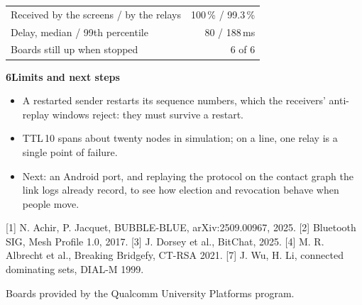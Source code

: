 \documentclass{article}
\renewcommand{\small}{\fontsize{24}{31}\selectfont}
\newcommand{\sect}[1]{\par\vfill\vspace{8mm}%
  {\color{navy}\fontsize{46}{52}\selectfont\bfseries #1\par}%
  \vspace{2mm}{\color{accent}\rule{\linewidth}{1.2mm}}\par\vspace{2mm}}
\begin{document}
\begin{minipage}[t][935mm][t]{245mm}
{\small
\begin{tabularx}{\linewidth}{@{}Xr@{}}
\toprule
Received by the screens / by the relays & 100\,\% / 99.3\,\% \\
Delay, median / 99th percentile & 80 / 188\,ms \\
Boards still up when stopped & 6 of 6 \\
\bottomrule
\end{tabularx}}

\sect{6\enspace Limits and next steps}
\begin{itemize}
  \item A restarted sender restarts its sequence numbers, which the
        receivers' anti-replay windows reject: they must survive a
        restart.
  \item TTL\,10 spans about twenty nodes in simulation; on a line, one
        relay is a single point of failure.
  \item Next: an Android port, and replaying the protocol on the contact
        graph the link logs already record, to see how election and
        revocation behave when people move.
\end{itemize}

\vspace{6mm}
{\fontsize{16}{20}\selectfont\color{muted}
[1] N. Achir, P. Jacquet, BUBBLE-BLUE, arXiv:2509.00967, 2025.
[2] Bluetooth SIG, Mesh Profile 1.0, 2017.
[3] J. Dorsey et al., BitChat, 2025.
[4] M. R. Albrecht et al., Breaking Bridgefy, CT-RSA 2021.
[7] J. Wu, H. Li, connected dominating sets, DIAL-M 1999.
\par\vspace{3mm}
Boards provided by the Qualcomm University Platforms program.\par}
\end{minipage}
\end{document}
